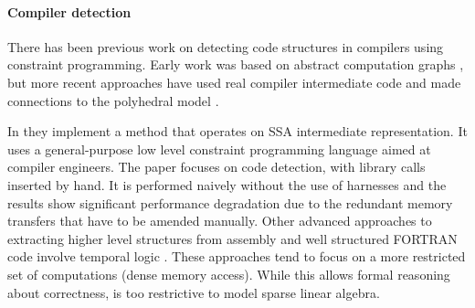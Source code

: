 \paragraph*{Compiler detection}
There has been previous work on
detecting code structures in compilers using constraint programming.
Early work was based on abstract computation graphs
\cite{pinter1994program}, but more recent approaches have used real
compiler intermediate code and made connections to the polyhedral
model \cite{Ginsbach:2018:CDS:3178372.3179515}.

In \cite{Ginsbach:2018:AML:3173162.3173182} they implement a method that operates on SSA
intermediate representation.
It uses a  general-purpose low level constraint programming language  aimed at
compiler engineers. %
The %
paper focuses  on code detection, with library calls inserted by hand.
It is performed naively without the use of harnesses and the results show
significant performance degradation due to the redundant memory transfers that
have to be amended manually.
Other advanced approaches to extracting higher
level structures from assembly and well structured FORTRAN code
involve temporal logic \cite{Mendis2015Helium, Kamil2016Verified}.
These approaches tend to focus on a more restricted set of
computations (dense memory access).
While this allows formal reasoning about correctness, is too restrictive to
model sparse linear algebra.



